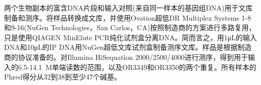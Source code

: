 \documentclass{ctexart}
\begin{document}
        两个生物副本的富含DNA片段和输入对照(来自同一样本的基因组DNA)用于文库制备和测序。将样品转换成文库，并使用Ovation超低DR Multiplex Systems 1-8和9-16(NuGen Technologies，San Carlos，CA)按照制造商的方案进行多路复用，只是使用QIAGEN MinElute PCR纯化试剂盒分离DNA。简而言之，用1μL的输入DNA和10μL的IP DNA用NuGen超低文库试剂盒制备测序文库。样品是根据制造商的协议准备的。对Illumina HiSequation 2000/2500/4000进行测序，得到用于输入的6.5-14.1~M单端读数的范围，以及OR3349和OR3350的两个重复。所有样本的Phred得分从32到38到至少47个碱基。
\end{document}
